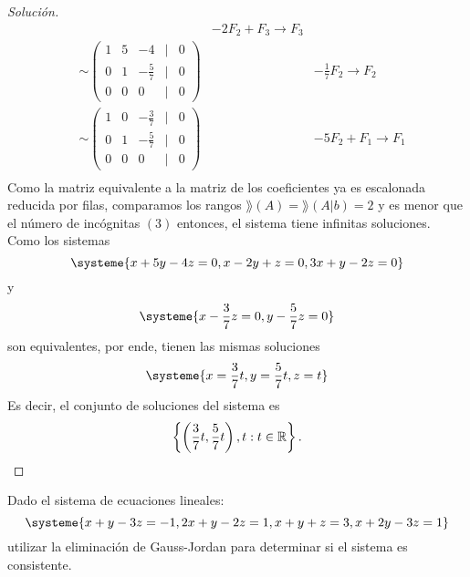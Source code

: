 \documentclass[a4,11pt]{aleph-notas}
\begin{document}
\begin{proof}[Solución]
\begin{align*}
      && -2F_2+F_3\to F_3\\
      & \sim 
      \begin{pmatrix}
        1&5&-4&|&0\\
        0&1&-\frac{5}{7}&|&0\\
        0&0&0&|&0
      \end{pmatrix}
      && -\frac{1}{7}F_2\to F_2\\
      & \sim 
      \begin{pmatrix}
        1&0&-\frac{3}{7}&|&0\\
        0&1&-\frac{5}{7}&|&0\\
        0&0&0&|&0
      \end{pmatrix}
      && -5F_2+F_1\to F_1\\
      \end{align*}
      Como la matriz equivalente a la matriz de los coeficientes ya es escalonada reducida por filas, comparamos los rangos $\rang (A) = \rang (A|b) = 2$ y es menor que el número de incógnitas $(3)$ entonces, el sistema tiene infinitas soluciones. Como los sistemas
      \[
      \systeme{x+5y-4z=0, x-2y+z=0, 3x+y-2z=0}
      \]
      y
      \[
      \systeme{x-\frac{3}{7}z=0, y-\frac{5}{7}z=0}
      \]
      son equivalentes, por ende, tienen las mismas soluciones
      \[
      \systeme{x=\frac{3}{7}t, y=\frac{5}{7}t, z=t}
      \]
      Es decir, el conjunto de soluciones del sistema es
      \[
      \left\{ \left( \frac{3}{7}t,\frac{5}{7}t\right),t:t \in \mathbb{R} \right\}.\qedhere
      \]
\end{proof}


\begin{ejer}
    Dado el sistema de ecuaciones lineales:
    \[
        \systeme{x+y-3z=-1, 2x+y-2z=1, x+y+z=3, x+2y-3z=1}
    \]
    utilizar la eliminación de Gauss-Jordan para determinar si el sistema es consistente.
\end{ejer}
\end{document}
